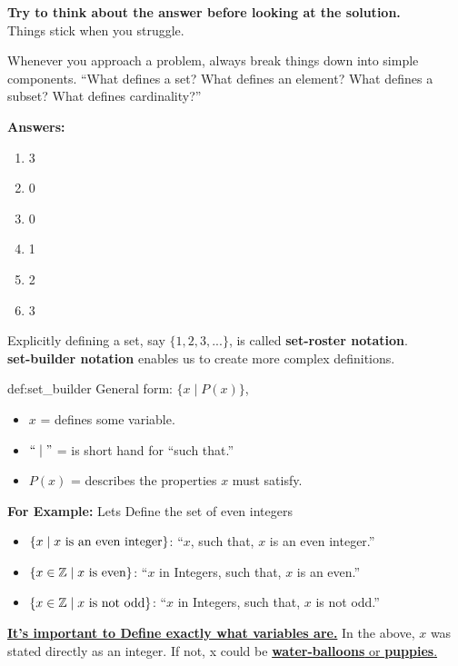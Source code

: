 \vspace{1em}

\noindent
\textbf{Try to think about the answer before looking at the solution.}\\
Things stick when you struggle.\\

\begin{Tip}
    Whenever you approach a problem, always break things down into simple components.
    ``What defines a set? What defines an element? What defines a subset? What defines cardinality?''\\
\end{Tip}

\noindent
\textbf{Answers:}
\begin{enumerate}
    \item 3
    \item 0
    \item 0
    \item 1
    \item 2
    \item 3
\end{enumerate}

\newpage

\noindent
Explicitly defining a set, say $\{1, 2, 3, ...\}$, is called \textbf{set-roster notation}.\\
\textbf{set-builder notation} enables us to create more complex definitions.

\begin{Def}{def:set_builder}
    General form: $\{x \mid P(x)\}$,
    \begin{itemize}
        \item $x$ = defines some variable.
        \item $``\mid"$ = is short hand for ``such that.''
        \item $P(x)$ = describes the properties $x$ must satisfy.
    \end{itemize}
\end{Def}

\noindent
\textbf{For Example:} Lets Define the set of even integers\\
\vspace{-1em}
\begin{itemize}
    \item $\{x \mid x \textnormal{ is an even integer}\}$: ``$x$, such that, $x$ is an even integer.''
    \item $\{x \in \mathbb{Z} \mid x \textnormal{ is even}\}$: ``$x$ in Integers, such that, $x$ is an even.''
    \item $\{x \in \mathbb{Z} \mid x \textnormal{ is not odd}\}$: ``$x$ in Integers, such that, $x$ is not odd.''
\end{itemize}

\noindent
\underline{\textbf{It's important to Define exactly what variables are.}}
In the above, $x$ was stated directly as an integer. If not, x could be \underline{\textbf{water-balloons} or \textbf{puppies}.}
